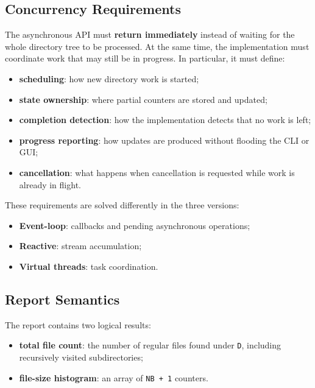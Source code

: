 \subsection{Concurrency Requirements}

The asynchronous API must \textbf{return immediately} instead of waiting for
the whole directory tree to be processed. At the same time, the implementation
must coordinate work that may still be in progress. In particular, it must
define:

\begin{itemize}
  \item \textbf{scheduling}: how new directory work is started;
  \item \textbf{state ownership}: where partial counters are stored and
  updated;
  \item \textbf{completion detection}: how the implementation detects that no
  work is left;
  \item \textbf{progress reporting}: how updates are produced without flooding
  the CLI or GUI;
  \item \textbf{cancellation}: what happens when cancellation is requested
  while work is already in flight.
\end{itemize}

These requirements are solved differently in the three versions:

\begin{itemize}
  \item \textbf{Event-loop}: callbacks and pending asynchronous operations;
  \item \textbf{Reactive}: stream accumulation;
  \item \textbf{Virtual threads}: task coordination.
\end{itemize}

\subsection{Report Semantics}

The report contains two logical results:

\begin{itemize}
  \item \textbf{total file count}: the number of regular files found under
  \texttt{D}, including recursively visited subdirectories;
  \item \textbf{file-size histogram}: an array of \texttt{NB + 1} counters.
\end{itemize}

